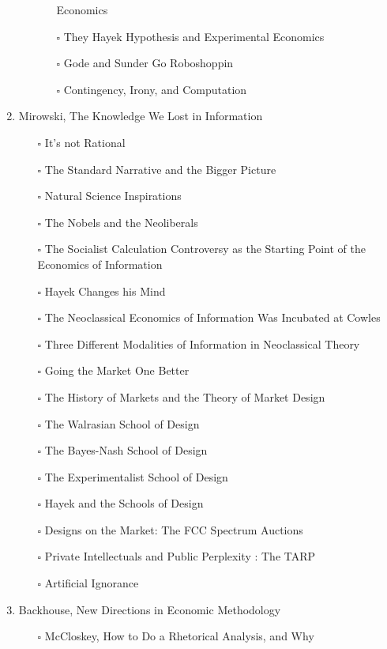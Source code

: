 \documentclass[paper=B6,portrait,twoside=true,twocolumn=false,headinclude=true,footinclude=false,fontsize=12,BCOR=10mm,DIV=calc,pagesize=auto,titlepage=firstiscover,mpinclude=false,headings=normal,headings=twolinechapter,open=right,toc=graduated,chapterprefix=false,numbers=endperiod,parskip=half+]{scrbook}
\theoremstyle{definition}
\begin{document}
\begin{enumerate}
\begin{itemize}
\begin{itemize}
Economics
\item[{$\square$}] They Hayek Hypothesis and Experimental Economics
\item[{$\square$}] Gode and Sunder Go Roboshoppin
\item[{$\square$}] Contingency, Irony, and Computation
\end{itemize}
\end{itemize}
\item\relax [0/17] Mirowski, The Knowledge We Lost in Information
\begin{itemize}
\item[{$\square$}] It's not Rational
\item[{$\square$}] The Standard Narrative and the Bigger Picture
\item[{$\square$}] Natural Science Inspirations
\item[{$\square$}] The Nobels and the Neoliberals
\item[{$\square$}] The Socialist Calculation Controversy as the Starting Point of the
Economics of Information
\item[{$\square$}] Hayek Changes his Mind
\item[{$\square$}] The Neoclassical Economics of Information Was Incubated at Cowles
\item[{$\square$}] Three Different Modalities of Information in Neoclassical Theory
\item[{$\square$}] Going the Market One Better
\item[{$\square$}] The History of Markets and the Theory of Market Design
\item[{$\square$}] The Walrasian School of Design
\item[{$\square$}] The Bayes-Nash School of Design
\item[{$\square$}] The Experimentalist School of Design
\item[{$\square$}] Hayek and the Schools of Design
\item[{$\square$}] Designs on the Market: The FCC Spectrum Auctions
\item[{$\square$}] Private Intellectuals and Public Perplexity : The TARP
\item[{$\square$}] Artificial Ignorance
\end{itemize}
\item\relax [2/4] Backhouse, New Directions in Economic Methodology
\begin{itemize}
\item[{$\square$}] McCloskey, How to Do a Rhetorical Analysis, and Why

\end{itemize}
\end{enumerate}
\end{document}
